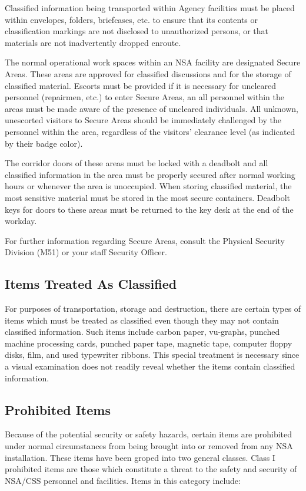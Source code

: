 \documentclass[a4]{article}
\begin{document}
Classified information being transported within Agency facilities must be
placed within envelopes, folders, briefcases, etc. to ensure that its contents
or classification markings are not disclosed to unauthorized persons, or that
materials are not inadvertently dropped enroute.

The normal operational work spaces within an NSA facility are designated Secure
Areas.  These areas are approved for classified discussions and for the storage
of classified material.  Escorts must be provided if it is necessary for
uncleared personnel (repairmen, etc.) to enter Secure Areas, an all personnel
within the areas must be made aware of the presence of uncleared individuals.
All unknown, unescorted visitors to Secure Areas should be immediately
challenged by the personnel within the area, regardless of the visitors'
clearance level (as indicated by their badge color).

The corridor doors of these areas must be locked with a deadbolt and all
classified information in the area must be properly secured after normal
working hours or whenever the area is unoccupied.  When storing classified
material, the most sensitive material must be stored in the most secure
containers.  Deadbolt keys for doors to these areas must be returned to the key
desk at the end of the workday.

For further information regarding Secure Areas, consult the Physical Security
Division (M51) or your staff Security Officer.

\subsection{Items Treated As Classified}

For purposes of transportation, storage and destruction, there are certain
types of items which must be treated as classified even though they may not
contain classified information.  Such items include carbon paper, vu-graphs,
punched machine processing cards, punched paper tape, magnetic tape, computer
floppy disks, film, and used typewriter ribbons.  This special treatment is
necessary since a visual examination does not readily reveal whether the items
contain classified information.

\subsection{Prohibited Items}

Because of the potential security or safety hazards, certain items are
prohibited under normal circumstances from being brought into or removed from
any NSA installation.  These items have been groped into two general classes.
Class I prohibited items are those which constitute a threat to the safety and
security of NSA/CSS personnel and facilities.  Items in this category include:
\end{document}
